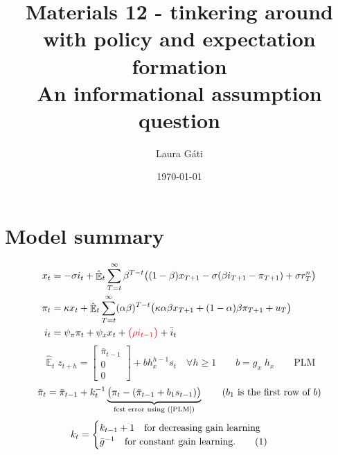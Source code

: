 \documentclass[11pt]{article}
\renewcommand{\[}{\begin{equation}}
\renewcommand{\]}{\end{equation}}
\DeclareMathOperator{\E}{\mathbb{E}}
\newcommand\numberthis{\addtocounter{equation}{1}\tag{\theequation}} %
\begin{document}
\linespread{1.0}

\title{Materials 12 - tinkering around with policy and expectation formation \\
An informational assumption question}
\author{Laura G\'ati} 
\date{\today}
\maketitle


\tableofcontents


\newpage
\section{Model summary}
\begin{align}
x_t &=  -\sigma i_t +\hat{\E}_t \sum_{T=t}^{\infty} \beta^{T-t }\big( (1-\beta)x_{T+1} - \sigma(\beta i_{T+1} - \pi_{T+1}) +\sigma r_T^n \big)  \label{prestons18}  \\
\pi_t &= \kappa x_t +\hat{\E}_t \sum_{T=t}^{\infty} (\alpha\beta)^{T-t }\big( \kappa \alpha \beta x_{T+1} + (1-\alpha)\beta \pi_{T+1} + u_T\big) \label{prestons19}  \\
i_t &= \psi_{\pi}\pi_t + \psi_{x} x_t  + \textcolor{red}{\big(\rho i_{t-1}\big)} + \bar{i}_t \label{TR}
\end{align}
\begin{equation}
\hat{\E}_t z_{t+h} =  \begin{bmatrix}\bar{\pi}_{t-1} \\ 0 \\ 0 \end{bmatrix}+ bh_x^{h-1}s_t  \quad \forall h\geq 1 \quad \quad b = g_x \; h_x \quad \quad \text{PLM} \label{PLM}
\end{equation}
\begin{equation}
\bar{\pi}_{t} = \bar{\pi}_{t-1} +k_t^{-1}\underbrace{\big(\pi_{t} -(\bar{\pi}_{t-1}+b_1s_{t-1}) \big)}_{\text{fcst error using (\ref{PLM})} } \quad \quad  \text{($b_1$ is the first row of $b$)}
\end{equation}
 \begin{align*}
k_t & = \begin{cases} k_{t-1}+1 \quad \text{for decreasing gain learning}  \\ \bar{g}^{-1}  \quad \text{for constant gain learning.}\numberthis
\end{cases} 
\end{align*}
\end{document}
